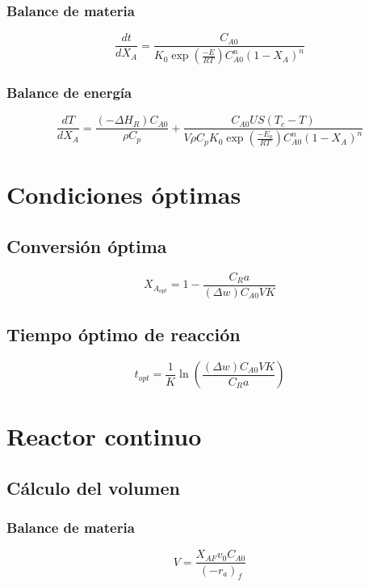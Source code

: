 \documentclass[20pt,a4paper]{extarticle}
\begin{document}
		\subsubsection{Balance de materia}
			\begin{equation*}
				\frac{dt}{dX_A} = \frac{C_{A0}}{K_0 \exp\left(\frac{-E}{RT}\right) C_{A0}^n (1-X_A)^n}
			\end{equation*}
			
		\subsubsection{Balance de energía}
			\begin{equation*}
				\frac{dT}{dX_A} = \frac{(-\Delta H_R)C_{A0}}{\rho C_p} + \frac{C_{A0}US(T_c-T)}{V\rho C_p K_0 \exp\left(\frac{-E_a}{RT}\right)C_{A0}^n(1-X_A)^n}
			\end{equation*}
			
\section{Condiciones óptimas}
	\subsection{Conversión óptima}
		\begin{equation*}
			X_{A_{opt}} = 1- \frac{C_R a}{(\Delta w) C_{A0}VK}
		\end{equation*}		
		
	\subsection{Tiempo óptimo de reacción}
		\begin{equation*}
			t_{opt} = \frac{1}{K}\ln \left(\frac{(\Delta w)C_{A0}VK}{C_R a}\right)
		\end{equation*}
		
\section{Reactor continuo}
	\subsection{Cálculo del volumen}
		\subsubsection{Balance de materia}
			\begin{equation*}
				V= \frac{X_{AF}v_0C_{A0}}{(-r_a)_f}
			\end{equation*}
			
\end{document}
